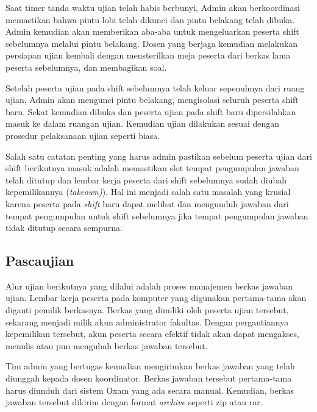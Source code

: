         Saat timer tanda waktu ujian telah habis berbunyi, Admin akan
        berkoordinasi memastikan bahwa pintu lobi telah dikunci dan pintu
        belakang telah dibuka. Admin kemudian akan memberikan aba-aba untuk
        mengeluarkan peserta shift sebelumnya melalui pintu belakang. Dosen yang
        berjaga kemudian melakukan persiapan ujian kembali dengan mensterilkan
        meja peserta dari berkas lama peserta sebelumnya, dan membagikan soal.
        
        Setelah peserta ujian pada shift sebelumnya telah keluar sepenuhnya dari
        ruang ujian, Admin akan mengunci pintu belakang, mengisolasi seluruh
        peserta shift baru. Sekat kemudian dibuka dan peserta ujian pada shift
        baru dipersilahkan masuk ke dalam ruangan ujian. Kemudian ujian
        dilakukan sesuai dengan prosedur pelaksanaan ujian seperti biasa.
        
        Salah satu catatan penting yang harus admin pastikan sebelum peserta
        ujian dari shift berikutnya masuk adalah memastikan slot tempat pengumpulan
        jawaban telah ditutup dan lembar kerja peserta dari shift sebelumnya sudah diubah
        kepemilikannya (\textit{takeown)}). Hal ini menjadi salah satu masalah yang krusial
        karena peserta pada \textit{shift} baru dapat melihat dan mengunduh jawaban dari tempat
        pengumpulan untuk shift sebelumnya jika tempat pengumpulan jawaban tidak ditutup secara sempurna.
    
    \subsection{Pascaujian}
        Alur ujian berikutnya yang dilalui adalah proses manajemen berkas
        jawaban ujian. Lembar kerja peserta pada komputer yang digunakan
        pertama-tama akan diganti pemilik berkasnya. Berkas yang dimiliki oleh
        peserta ujian tersebut, sekarang menjadi milik akun administrator
        fakultas. Dengan pergantiannya kepemilikan tersebut, akun peserta secara
        efektif tidak akan dapat mengakses, menulis atau pun mengubah berkas
        jawaban tersebut.
        
        Tim admin yang bertugas kemudian mengirimkan berkas jawaban yang telah
        diunggah kepada dosen koordinator. Berkas jawaban tersebut pertama-tama
        harus diunduh dari sistem Oxam yang ada secara manual. Kemudian, berkas
        jawaban tersebut dikirim dengan format \textit{archive} seperti zip atau
        rar.

